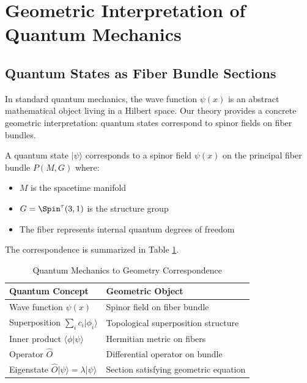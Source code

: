 \section{Geometric Interpretation of Quantum Mechanics}
\label{sec:quantum}

\subsection{Quantum States as Fiber Bundle Sections}

In standard quantum mechanics, the wave function $\psi(x)$ is an abstract mathematical object living in a Hilbert space. Our theory provides a concrete geometric interpretation: quantum states correspond to spinor fields on fiber bundles.

\begin{definition}
A quantum state $|\psi\rangle$ corresponds to a spinor field $\psi(x)$ on the principal fiber bundle $P(M, G)$ where:
\begin{itemize}
    \item $M$ is the spacetime manifold
    \item $G = \Spin^\tau(3,1)$ is the structure group
    \item The fiber represents internal quantum degrees of freedom
\end{itemize}
\end{definition}

The correspondence is summarized in Table \ref{tab:quantum_correspondence}.

\begin{table}[htbp]
\centering
\caption{Quantum Mechanics to Geometry Correspondence}
\label{tab:quantum_correspondence}
\begin{tabular}{ll}
\toprule
\textbf{Quantum Concept} & \textbf{Geometric Object} \\
\midrule
Wave function $\psi(x)$ & Spinor field on fiber bundle \\
Superposition $\sum_i c_i |\phi_i\rangle$ & Topological superposition structure \\
Inner product $\langle\phi|\psi\rangle$ & Hermitian metric on fibers \\
Operator $\hat{O}$ & Differential operator on bundle \\
Eigenstate $\hat{O}|\psi\rangle = \lambda|\psi\rangle$ & Section satisfying geometric equation \\
\bottomrule
\end{tabular}
\end{table}

